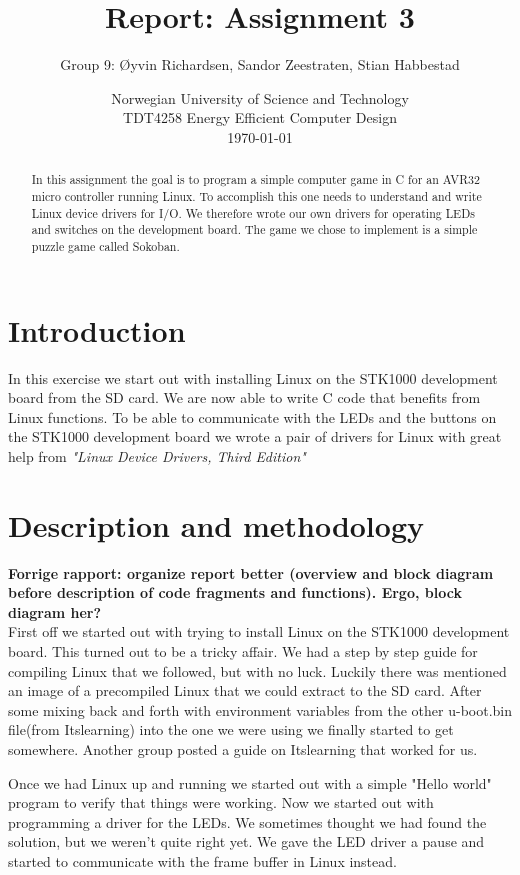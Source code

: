 \documentclass[a4paper,11pt]{article}
\title{\textbf{Report: Assignment 3}}
\author{Group 9: \O yvin Richardsen, Sandor Zeestraten, Stian Habbestad}
\date{{Norwegian University of Science and Technology \\
TDT4258 Energy Efficient Computer Design \\}
\today}
\begin{document}
\maketitle

\begin{abstract}
In this assignment the goal is to program a simple computer game in C for an AVR32 micro controller running Linux. To accomplish this one needs to understand and write Linux device drivers for I/O. We therefore wrote our own drivers for operating LEDs and switches on the development board. The game we chose to implement is a simple puzzle game called Sokoban.
\end{abstract}

\bigskip
\tableofcontents
\newpage

\section{Introduction}
In this exercise we start out with installing Linux on the STK1000 development board from the SD card. We are now able to write C code that benefits from Linux functions. %
To be able to communicate with the LEDs and the buttons on the STK1000 development board we wrote a pair of drivers for Linux with great help from \textit{"Linux Device Drivers, Third Edition"} \cite{ldd}


\section{Description and methodology}
\textbf{Forrige rapport: organize report better (overview and block diagram before description of code fragments and functions). Ergo, block diagram her?}\\

First off we started out with trying to install Linux on the STK1000 development board. This turned out to be a tricky affair. We had a step by step guide for compiling Linux that we followed, but with no luck. Luckily there was mentioned an image of a precompiled Linux that we could extract to the SD card. After some mixing back and forth with environment variables from the other u-boot.bin file(from Itslearning) into the one we were using we finally started to get somewhere. Another group posted a guide on Itslearning that worked for us.

Once we had Linux up and running we started out with a simple "Hello world" program to verify that things were working. Now we started out with programming a driver for the LEDs. We sometimes thought we had found the solution, but we weren't quite right yet. We gave the LED driver a pause and started to communicate with the frame buffer in Linux instead. 
\end{document}
